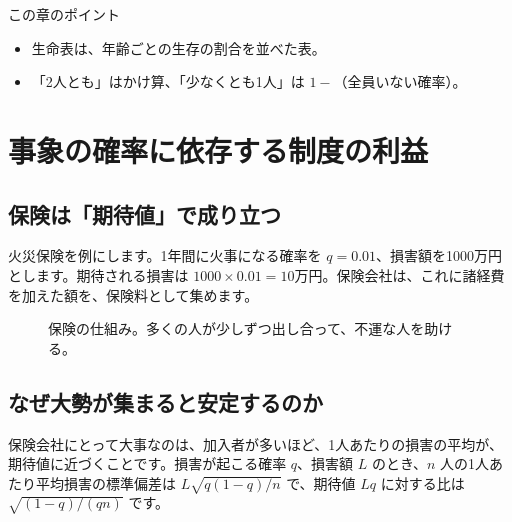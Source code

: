 \documentclass[a4paper,11pt,openany]{ltjsbook}
\begin{document}
\begin{pointbox}{この章のポイント}
\begin{itemize}[leftmargin=1.5em]
\item 生命表は、年齢ごとの生存の割合を並べた表。
\item 「2人とも」はかけ算、「少なくとも1人」は $1-$（全員いない確率）。
\end{itemize}
\end{pointbox}

\chapter{事象の確率に依存する制度の利益}

\section{保険は「期待値」で成り立つ}

火災保険を例にします。1年間に火事になる確率を $q=0.01$、損害額を1000万円とします。期待される損害は $1000\times0.01=10$万円。保険会社は、これに諸経費を加えた額を、保険料として集めます。

\begin{figure}[htbp]
\centering
{}
\caption{保険の仕組み。多くの人が少しずつ出し合って、不運な人を助ける。}
\end{figure}

\section{なぜ大勢が集まると安定するのか}

保険会社にとって大事なのは、加入者が多いほど、1人あたりの損害の平均が、期待値に近づくことです。損害が起こる確率 $q$、損害額 $L$ のとき、$n$ 人の1人あたり平均損害の標準偏差は $L\sqrt{q(1-q)/n}$ で、期待値 $Lq$ に対する比は $\sqrt{(1-q)/(qn)}$ です。
\end{document}
